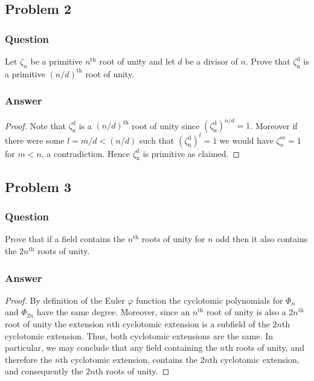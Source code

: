 \documentclass[10pt]{article}
\begin{document}
\subsection{Problem 2}
\subsubsection{Question}
Let $\zeta_n$ be a primitive $n^\mathrm{th}$ root of unity and let $d$ be a divisor of $n$. Prove that $\zeta_\mathrm{n}^\mathrm{d}$ is a primitive $(n/d)^\mathrm{th}$ root of unity.
\subsubsection{Answer}
\begin{proof}
Note that $\zeta_\mathrm{n}^\mathrm{d}$ is a $(n/d)^\mathrm{th}$ root of unity since $(\zeta_\mathrm{n}^\mathrm{d} )^{n/d}=1$. Moreover if there were some $l=m/d< (n/d)$ such that  $(\zeta_\mathrm{n}^\mathrm{d})^l =1 $ we would have $\zeta_n^m=1$ for $m<n$, a contradiction. Hence $\zeta_\mathrm{n}^\mathrm{d}$ is primitive as claimed.\end{proof}

\subsection{Problem 3}
\subsubsection{Question}
Prove that if a field contains the $n^\mathrm{th}$ roots of unity for $n$ odd then it also contains the $2n^\mathrm{th}$ roots of unity.
\subsubsection{Answer}
\begin{proof}
By definition of the Euler $\varphi$ function the cyclotomic polynomials for $\Phi_n$ and $\Phi_{2n}$ have the same degree. Moreover, since an $n^{\mathrm{th}}$ root of unity is also a $2n^{\mathrm{th}}$ root of unity the extension $n$th cyclotomic extension is a subfield of the $2n$th cyclotomic extension. Thus, both cyclotomic extensions are the same. In particular, we may conclude that any field containing the $n$th roots of unity, and therefore the $n$th cyclotomic extension, contains the $2n$th cyclotomic extension, and consequently the $2n$th roots of unity. 
\end{proof}
\end{document}
